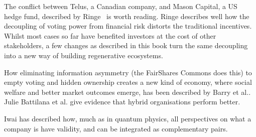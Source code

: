 The conflict between Telus, a Canadian company, and Mason Capital, a US hedge fund, described by Ringe~\cite{ringe-revisited} is worth reading. Ringe describes well how the decoupling of voting power from financial risk distorts the traditional incentives. Whilst most cases so far have benefited investors at the cost of other stakeholders, a few changes as described in this book turn the same decoupling into a new way of building regenerative ecosystems. 


How eliminating information asymmetry (the FairShares Commons does this) to empty voting and hidden ownership creates a new kind of economy, where social welfare and better market outcomes emerge, has been described by Barry et al.\cite{barry-social-welfare}. Julie Battilana et al. give evidence that hybrid organisations perform better\cite{battilana-hybrid}.


Iwai has described how, much as in quantum physics, all perspectives on what a company is have validity\cite{iwai-persons}, and can be integrated as complementary pairs.


